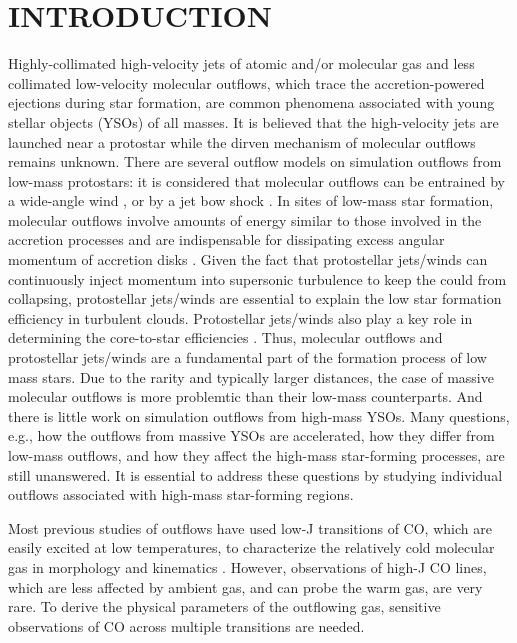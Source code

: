 \section{INTRODUCTION}
Highly-collimated high-velocity jets of atomic and/or molecular gas and less collimated low-velocity molecular outflows, which trace the accretion-powered ejections during star formation, are common phenomena associated with young stellar objects (YSOs) of all masses\citep{ 1985ARA&A..23..267L,1993prpl.conf..603F, 2001ApJ...552L.167Z,2002A&A...383..892B, 2004A&A...426..503W, 2006A&A...453..785F, 2007prpl.conf..245A, 2015MNRAS.453..645M}. It is believed that the high-velocity jets are launched near a protostar while the dirven mechanism of molecular outflows remains unknown. There are several outflow models on simulation outflows from low-mass protostars: it is considered that molecular outflows can be entrained by a wide-angle wind \citep{1996ApJ...472..211L, 2001ApJ...557..429L, 2007prpl.conf..277P}, or by a jet bow shock \citep{ 1999A&A...344..687H, 2001ApJ...557..429L}. In sites of low-mass star formation, molecular outflows involve amounts of energy similar to those involved in the accretion processes and are indispensable for dissipating excess angular momentum of accretion disks \citep{1987ARA&A..25...23S, 1996ARA&A..34..111B}. Given the fact that protostellar jets/winds can continuously inject momentum into supersonic turbulence to keep the could from collapsing, protostellar jets/winds are essential to explain the low star formation efficiency in turbulent clouds. Protostellar jets/winds also play a key role in determining the core-to-star efficiencies \citep{2014prpl.conf..451F}. Thus, molecular outflows and protostellar jets/winds are a fundamental part of the formation process of low mass stars. Due to the rarity and typically larger distances, the case of massive molecular outflows is more problemtic than their low-mass counterparts. And there is little work on simulation outflows from high-mass YSOs. Many questions, e.g., how the outflows from massive YSOs are accelerated, how they differ from low-mass outflows, and how they affect the high-mass star-forming processes, are still unanswered. It is essential to address these questions by studying individual outflows associated with high-mass star-forming regions. 

Most previous studies of outflows have used low-J transitions of CO, which are easily excited at low temperatures, to characterize the relatively cold molecular gas in morphology and kinematics \citep{2008ApJ...675..454Y, 2009ApJ...696...66Q,  2009ApJ...702L..66Q, 2011ApJ...728....6Q, 2013ApJ...774...39A}. However, observations of high-J CO lines, which are less affected by ambient gas, and can probe the warm gas, are very rare. To derive the physical parameters of the outflowing gas, sensitive observations of CO across multiple transitions are needed. 

